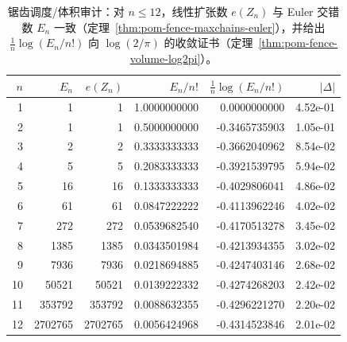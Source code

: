 \begin{table}[H]
\centering
\scriptsize
\setlength{\tabcolsep}{6pt}
\caption{锯齿调度/体积审计：对 $n\le 12$，线性扩张数 $e(Z_n)$ 与 Euler 交错数 $E_n$ 一致（定理~\ref{thm:pom-fence-maxchains-euler}），并给出 $\frac{1}{n}\log(E_n/n!)$ 向 $\log(2/\pi)$ 的收敛证书（定理~\ref{thm:pom-fence-volume-log2pi}）。}
\label{tab:fence_scheduling_euler_volume_audit}
\begin{tabular}{r r r r r r}
\toprule
$n$ & $E_n$ & $e(Z_n)$ & $E_n/n!$ & $\frac{1}{n}\log(E_n/n!)$ & $|\Delta|$\\
\midrule
1 & 1 & 1 & 1.0000000000 & 0.0000000000 & 4.52e-01\\
2 & 1 & 1 & 0.5000000000 & -0.3465735903 & 1.05e-01\\
3 & 2 & 2 & 0.3333333333 & -0.3662040962 & 8.54e-02\\
4 & 5 & 5 & 0.2083333333 & -0.3921539795 & 5.94e-02\\
5 & 16 & 16 & 0.1333333333 & -0.4029806041 & 4.86e-02\\
6 & 61 & 61 & 0.0847222222 & -0.4113962246 & 4.02e-02\\
7 & 272 & 272 & 0.0539682540 & -0.4170513278 & 3.45e-02\\
8 & 1385 & 1385 & 0.0343501984 & -0.4213934355 & 3.02e-02\\
9 & 7936 & 7936 & 0.0218694885 & -0.4247403146 & 2.68e-02\\
10 & 50521 & 50521 & 0.0139222332 & -0.4274268203 & 2.42e-02\\
11 & 353792 & 353792 & 0.0088632355 & -0.4296221270 & 2.20e-02\\
12 & 2702765 & 2702765 & 0.0056424968 & -0.4314523846 & 2.01e-02\\
\bottomrule
\end{tabular}
\end{table}
